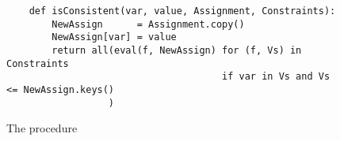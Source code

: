 \begin{figure}[!ht]
\centering
\begin{verbatim}  
    def isConsistent(var, value, Assignment, Constraints):
        NewAssign      = Assignment.copy()
        NewAssign[var] = value
        return all(eval(f, NewAssign) for (f, Vs) in Constraints
                                      if var in Vs and Vs <= NewAssign.keys()
                  )
\end{verbatim}
\vspace*{-0.3cm}
\caption{The procedure }
\label{fig:CSP-Solver.ipynb-isConsistent}
\end{figure}

